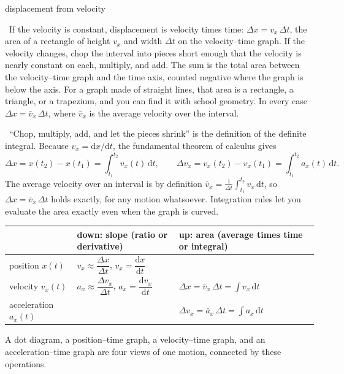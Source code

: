 \documentclass[11pt,twoside,openany]{book}
\newcommand{\dd}{\mathrm{d}}
\newcommand{\viewtag}[3]{\fcolorbox{#2}{#3}{\footnotesize\textbf{\textcolor{#2}{#1}}}}
\newcommand{\elemtag}{\viewtag{Elementary}{elemcol}{elempale}}
\newcommand{\calctag}{\viewtag{Calculus}{calccol}{calcpale}}
\newcommand{\elem}{\par\medskip\noindent\elemtag\ }
\newcommand{\calc}{\par\medskip\noindent\calctag\ }
\begin{document}
\begin{twoviews}{displacement from velocity}
\elem If the velocity is constant, displacement is velocity times time: $\Delta x = v_x\,\Delta t$, the area of a rectangle of height $v_x$ and width $\Delta t$ on the velocity--time graph. If the velocity changes, chop the interval into pieces short enough that the velocity is nearly constant on each, multiply, and add. The sum is the total area between the velocity--time graph and the time axis, counted negative where the graph is below the axis. For a graph made of straight lines, that area is a rectangle, a triangle, or a trapezium, and you can find it with school geometry. In every case $\Delta x = \bar v_x\,\Delta t$, where $\bar v_x$ is the average velocity over the interval.

\calc ``Chop, multiply, add, and let the pieces shrink'' is the definition of the definite integral. Because $v_x = \dd x/\dd t$, the fundamental theorem of calculus gives
\begin{equation}
\Delta x = x(t_2) - x(t_1) = \int_{t_1}^{t_2} v_x(t)\,\dd t,
\qquad
\Delta v_x = v_x(t_2) - v_x(t_1) = \int_{t_1}^{t_2} a_x(t)\,\dd t.
\label{eq:ftc}
\end{equation}
The average velocity over an interval is by definition $\bar v_x = \frac{1}{\Delta t}\int_{t_1}^{t_2} v_x\,\dd t$, so $\Delta x = \bar v_x\,\Delta t$ holds exactly, for any motion whatsoever. Integration rules let you evaluate the area exactly even when the graph is curved.
\end{twoviews}

\begin{keyidea}
\begin{center}
\renewcommand{\arraystretch}{1.4}
\small
\begin{tabular}{lll}
\toprule
 & down: slope (ratio or derivative) & up: area (average times time or integral) \\
\midrule
position $x(t)$ & $v_x \approx \dfrac{\Delta x}{\Delta t}$, \; $v_x = \dfrac{\dd x}{\dd t}$ & \\[6pt]
velocity $v_x(t)$ & $a_x \approx \dfrac{\Delta v_x}{\Delta t}$, \; $a_x = \dfrac{\dd v_x}{\dd t}$ & $\Delta x = \bar v_x\,\Delta t = \displaystyle\int v_x\,\dd t$ \\[6pt]
acceleration $a_x(t)$ & & $\Delta v_x = \bar a_x\,\Delta t = \displaystyle\int a_x\,\dd t$ \\
\bottomrule
\end{tabular}
\end{center}
A dot diagram, a position--time graph, a velocity--time graph, and an acceleration--time graph are four views of one motion, connected by these operations.
\end{keyidea}
\end{document}
